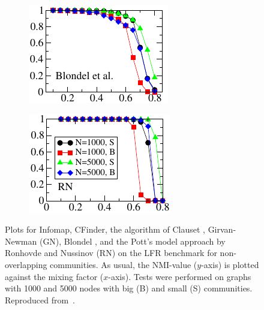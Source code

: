 \begin{figure}[h!]
\begin{subfigure}{0.35\textwidth}
    \end{subfigure}%
    \begin{subfigure}{0.35\textwidth}
    \centering
    \includegraphics[width=\otherplotswidth]{lfrpaper/5_split_kropped.pdf}
    \end{subfigure}%
    \begin{subfigure}{0.35\textwidth}
    \centering
    \includegraphics[width=\otherplotswidth]{lfrpaper/6_split_kropped.pdf}
    \end{subfigure}%
    \caption{
        Plots for Infomap, CFinder, the algorithm of Clauset \etal, Girvan-Newman (GN), Blondel \etal, 
        and the Pott's model approach by Ronhovde and Nussinov (RN) on the LFR benchmark for non-overlapping 
		communities. As usual, the NMI-value ($y$-axis) is plotted against the mixing factor ($x$-axis).
        Tests were performed on graphs with 1000 and 5000 nodes with big (B) and small (S) communities.
        Reproduced from~\cite{LF09}.
    }\label{fig:Infomap_etal}
\end{figure}

